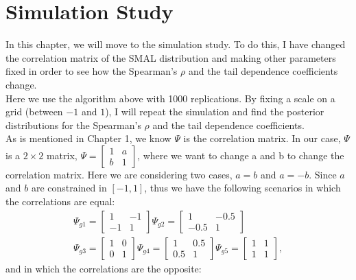 \documentclass[mstat,12pt]{unswthesis}  %
\numberwithin{equation}{section}
\begin{document}
\chapter{Simulation Study}\label{ccl}
In this chapter, we will move to the simulation study. To do this, I have changed the correlation matrix of the SMAL distribution and making other parameters fixed in order to see how the Spearman's $\rho$ and the tail dependence coefficients change. \\
Here we use the algorithm above with 1000 replications. By fixing a scale on a grid (between $-1$ and $1$), I will repeat the simulation and find the posterior distributions for the Spearman's $\rho$ and the tail dependence coefficients. \\
As is mentioned in Chapter 1, we know $\Psi$ is the correlation matrix. In our case, $\Psi$ is a $2 \times 2$ matrix, $\Psi=\left[\begin{array}{ccc}1 & a  \\ b & 1\end{array}\right]$, where we want to change a and b to change the correlation matrix. Here we are considering two cases, $a=b$ and $a=-b$. Since $a$ and $b$ are constrained in $[-1,1]$, thus we have the following scenarios in which the correlations are equal:
\begin{equation}
\begin{split}
\Psi_{g1}=\left[\begin{array}{ll}
1 & -1 \\
-1 & 1
\end{array}\right] \Psi_{g2}=\left[\begin{array}{ll}
1 & -0.5 \\
-0.5 & 1
\end{array}\right]\\ \Psi_{g3}=\left[\begin{array}{ll}
1 & 0 \\
0 & 1
\end{array}\right] \Psi_{g4}=\left[\begin{array}{ll}
1 & 0.5 \\
0.5 & 1
\end{array}\right] \Psi_{g5}=\left[\begin{array}{ll}
1 & 1 \\
1 & 1
\end{array}\right],
\end{split}
\end{equation}
and in which the correlations are the opposite:
\end{document}
